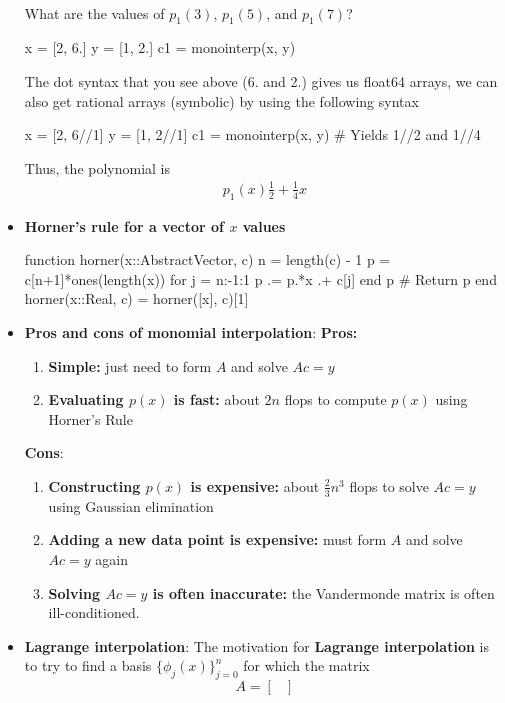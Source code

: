 \documentclass{report}
\begin{document}
\begin{itemize}
\begin{align*}
\end{align*}
What are the values of $p_1(3)$, $p_1(5)$, and $p_1(7)$?
\bigbreak \noindent 
\begin{jlcode}
x = [2, 6.]
y = [1, 2.]
c1 = monointerp(x, y)
\end{jlcode}
\bigbreak \noindent 
The dot syntax that you see above (6. and 2.) gives us float64 arrays, we can also get rational arrays (symbolic) by using the following syntax
\bigbreak \noindent 
\begin{jlcode}
x = [2, 6//1]
y = [1, 2//1]
c1 = monointerp(x, y)
# Yields 1//2 and 1//4
\end{jlcode}
\bigbreak \noindent 
Thus, the polynomial is 
\begin{align*}
    p_{1}(x)\frac{1}{2} + \frac{1}{4}x
\end{align*}
\item \textbf{Horner's rule for a vector of $x$ values}
    \bigbreak \noindent 
    \begin{jlcode}
function horner(x::AbstractVector, c)
    n = length(c) - 1
    p = c[n+1]*ones(length(x))
    for j = n:-1:1
        p .= p.*x .+ c[j]
    end
    p # Return p
end
horner(x::Real, c) = horner([x], c)[1]
    \end{jlcode}
\item \textbf{Pros and cons of monomial interpolation}:
    \textbf{Pros:}
    \begin{enumerate}
        \item \textbf{Simple:} just need to form $A$ and solve $Ac = y$
        \item \textbf{Evaluating $p(x)$ is fast:} about $2n$ flops to compute $p(x)$ using Horner's Rule
    \end{enumerate}
\textbf{Cons}:
\begin{enumerate}
    \item \textbf{Constructing $p(x)$ is expensive:} about $\frac{2}{3}n^3$ flops to solve $Ac = y$ using Gaussian elimination
    \item \textbf{Adding a new data point is expensive:} must form $A$ and solve $Ac = y$ again
    \item \textbf{Solving $Ac = y$ is often inaccurate:} the Vandermonde matrix is often ill-conditioned.
\end{enumerate}
\item \textbf{Lagrange interpolation}:
    The motivation for \textbf{Lagrange interpolation} is to try to find a basis $\{\phi_j(x)\}_{j=0}^n$ for which the matrix
    $$
    A = 
    \begin{bmatrix}

\end{bmatrix}$$
\end{itemize}
\end{document}
